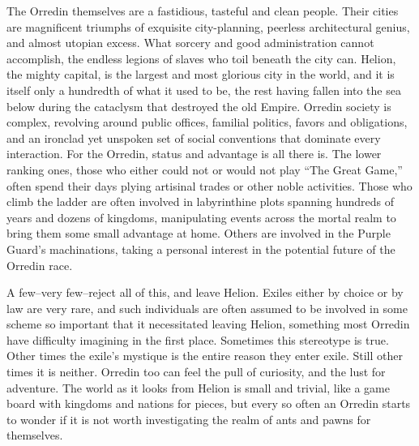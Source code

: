 \documentclass[oneside,11pt,english]{book}
\begin{document}
The Orredin themselves are a fastidious, tasteful and clean people. Their cities are magnificent triumphs 
of exquisite city-planning, peerless architectural genius, and almost utopian excess. What sorcery and 
good administration cannot accomplish, the endless legions of slaves who toil beneath the city can. 
Helion, the mighty capital, is the largest and most glorious city in the world, and it is itself only a 
hundredth of what it used to be, the rest having fallen into the sea below during the cataclysm that 
destroyed the old Empire. 
Orredin society is complex, revolving around public offices, familial politics, favors and obligations, and 
an ironclad yet unspoken set of social conventions that dominate every interaction. For the Orredin, status 
and advantage is all there is. The lower ranking ones, those who either could not or would not play “The 
Great Game,” often spend their days plying artisinal trades or other noble activities. Those who climb the 
ladder are often involved in labyrinthine plots spanning hundreds of years and dozens of kingdoms, 
manipulating events across the mortal realm to bring them some small advantage at home. Others are 
involved in the Purple Guard’s machinations, taking a personal interest in the potential future of the 
Orredin race. 


A few--very few--reject all of this, and leave Helion. Exiles either by choice or by law are very rare, and 
such individuals are often assumed to be involved in some scheme so important that it necessitated 
leaving Helion, something most Orredin have difficulty imagining in the first place. Sometimes this 
stereotype is true. Other times the exile’s mystique is the entire reason they enter exile. Still other times it 
is neither. Orredin too can feel the pull of curiosity, and the lust for adventure. The world as it looks from 
Helion is small and trivial, like a game board with kingdoms and nations for pieces, but every so often an 
Orredin starts to wonder if it is not worth investigating the realm of ants and pawns for themselves. 
\end{document}
